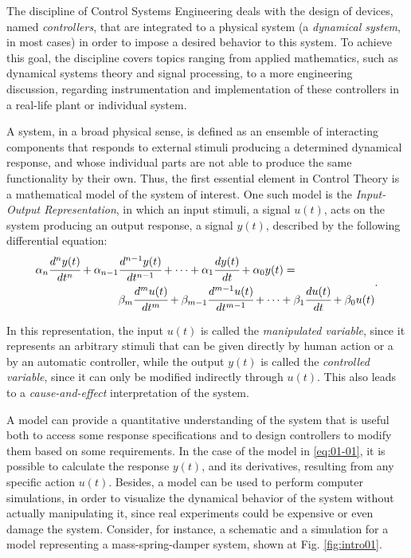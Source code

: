 \documentclass[a4paper,11pt]{book}
\numberwithin{figure}{chapter}
\numberwithin{equation}{chapter}
\numberwithin{table}{chapter}
\theoremstyle{definition}
\begin{document}
The discipline of Control Systems Engineering deals with the design of devices, named \textit{controllers}, that are integrated to a physical system (a \textit{dynamical system}, in most cases) in order to impose a desired behavior to this system. To achieve this goal, the discipline covers topics ranging from applied mathematics, such as dynamical systems theory and signal processing, to a more engineering discussion, regarding instrumentation and implementation of these controllers in a real-life plant or individual system. 

A system, in a broad physical sense, is defined as an ensemble of interacting components that responds to external stimuli producing a determined dynamical response, and whose individual parts are not able to produce the same functionality by their own. Thus, the first essential element in Control Theory is a mathematical model of the system of interest. One such model is the \textit{Input-Output Representation}, in which an input stimuli, a signal $u(t)$, acts on the system producing an output response, a signal $y(t)$, described by the following differential equation:
\begin{equation} \label{eq:01-01}
\begin{split}
    \alpha_n \cfrac{d^n y(t)}{dt^n} + \alpha_{n-1} & \cfrac{d^{n-1} y(t)}{dt^{n-1}} + \cdots + \alpha_{1} \cfrac{d y(t)}{dt} + \alpha_{0} y(t) = \\
    & \beta_m \cfrac{d^m u(t)}{dt^m} + \beta_{m-1} \cfrac{d^{m-1} u(t)}{dt^{m-1}} + \cdots + \beta_{1} \cfrac{d u(t)}{dt} + \beta_{0} u(t)
\end{split}
.\end{equation}

In this representation, the input $u(t)$ is called the \textit{manipulated variable}, since it represents an arbitrary stimuli that can be given directly by human action or a by an automatic controller, while the output $y(t)$ is called the \textit{controlled variable}, since it can only be modified indirectly through $u(t)$. This also leads to a \textit{cause-and-effect} interpretation of the system.

A model can provide a quantitative understanding of the system that is useful both to access some response specifications and to design controllers to modify them based on some requirements. In the case of the model in \eqref{eq:01-01}, it is possible to calculate the response $y(t)$, and its derivatives, resulting from any specific action $u(t)$. Besides, a model can be used to perform computer simulations, in order to visualize the dynamical behavior of the system without actually manipulating it, since real experiments could be expensive or even damage the system. Consider, for instance, a schematic and a simulation for a model representing a mass-spring-damper system, shown at Fig. \ref{fig:intro01}.
\end{document}
